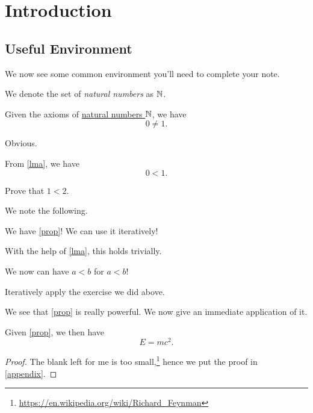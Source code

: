\chapter{Introduction}
\section{Useful Environment}
We now see some common environment you'll need to complete your note.

\begin{definizione}\label{def}
  We denote the set of \emph{natural numbers} as \(\mathbb{\MakeUppercase{n}} \).
\end{definizione}


\begin{lemma}\label{lma}
  Given the axioms of \hyperref[def]{natural numbers \(\mathbb{\MakeUppercase{n}} \)}, we have
  \[
    0\neq 1.
  \]
  \begin{dimostrazione}
    Obvious.
  \end{dimostrazione}
\end{lemma}
\begin{proposizione}\label{prop}
  From \autoref{lma}, we have
  \[
    0<1.
  \]
\end{proposizione}
\begin{esercizio}
  Prove that \(1 < 2\).
\end{esercizio}
\begin{risposta}
  We note the following.
  \begin{nota}
    We have \autoref{prop}! We can use it iteratively!
  \end{nota}
  With the help of \autoref{lma}, this holds trivially.
\end{risposta}
\begin{es}
  We now can have \(a < b\) for \(a < b\)!
\end{es}
\begin{spiegaz}
  Iteratively apply the exercise we did above.
\end{spiegaz}
\begin{osservazione}
  We see that \autoref{prop} is really powerful. We now give an immediate application of it.
\end{osservazione}

\begin{teorema}\label{thm}
  Given \autoref{prop}, we then have
  \[
    E = mc^2.
  \]
\end{teorema}
\begin{proof}
  The blank left for me is too small,\footnote{\url{https://en.wikipedia.org/wiki/Richard_Feynman}} hence we put the proof in \autoref{appendix}.
\end{proof}

